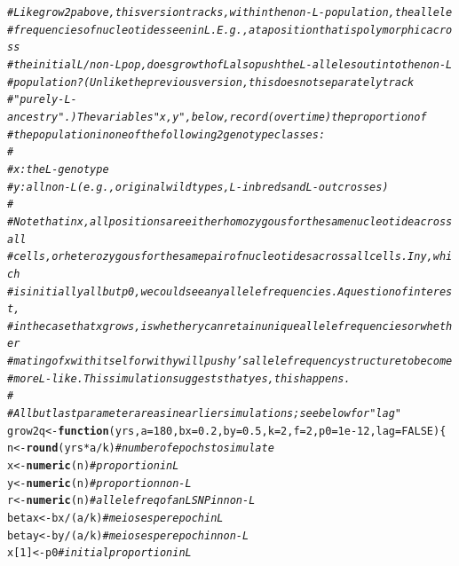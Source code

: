 \documentclass{article}\usepackage[]{graphicx}\usepackage[]{color}
\makeatletter
\newcommand{\hlnum}[1]{\textcolor[rgb]{0.686,0.059,0.569}{#1}}%
\newcommand{\hlcom}[1]{\textcolor[rgb]{0.678,0.584,0.686}{\textit{#1}}}%
\newcommand{\hlopt}[1]{\textcolor[rgb]{0,0,0}{#1}}%
\newcommand{\hlstd}[1]{\textcolor[rgb]{0.345,0.345,0.345}{#1}}%
\newcommand{\hlkwa}[1]{\textcolor[rgb]{0.161,0.373,0.58}{\textbf{#1}}}%
\newcommand{\hlkwb}[1]{\textcolor[rgb]{0.69,0.353,0.396}{#1}}%
\newcommand{\hlkwc}[1]{\textcolor[rgb]{0.333,0.667,0.333}{#1}}%
\newcommand{\hlkwd}[1]{\textcolor[rgb]{0.737,0.353,0.396}{\textbf{#1}}}%
\newenvironment{kframe}{%
 \def\at@end@of@kframe{}%
 \ifinner\ifhmode%
  \def\at@end@of@kframe{\end{minipage}}%
  \begin{minipage}{\columnwidth}%
 \fi\fi%
 \def\FrameCommand##1{\hskip\@totalleftmargin \hskip-\fboxsep
 \colorbox{shadecolor}{##1}\hskip-\fboxsep
     \hskip-\linewidth \hskip-\@totalleftmargin \hskip\columnwidth}%
 \MakeFramed {\advance\hsize-\width
   \@totalleftmargin\z@ \linewidth\hsize
   \@setminipage}}%
 {\par\unskip\endMakeFramed%
 \at@end@of@kframe}
\newenvironment{knitrout}{}{} %
\makeatother
\begin{document}
\begin{knitrout}\footnotesize
{}\color{fgcolor}\begin{kframe}
\begin{alltt}
\hlcom{# Like grow2p above, this version tracks, within the non-L-population, the allele}
\hlcom{# frequencies of nucleotides seen in L.  E.g., at a position that is polymorphic across}
\hlcom{# the initial L/non-L pop, does growth of L also push the L-alleles out into the non-L}
\hlcom{# population?  (Unlike the previous version, this does not separately track }
\hlcom{# "purely-L-ancestry".) The variables "x, y", below, record (over time) the proportion of }
\hlcom{# the population in one of the following 2 genotype classes:}
\hlcom{# }
\hlcom{#   x: the L-genotype}
\hlcom{#   y: all non-L (e.g., original wildtypes, L-inbreds and L-outcrosses)}
\hlcom{# }
\hlcom{# Note that in x, all positions are either homozygous for the same nucleotide across all }
\hlcom{# cells, or heterozygous for the same pair of nucleotides across all cells.  In y, which }
\hlcom{# is initially all but p0, we could see any allele frequencies.  A question of interest, }
\hlcom{# in the case that x grows, is whether y can retain unique allele frequencies or whether }
\hlcom{# mating of x with itself or with y will push y's allele frequency structure to become }
\hlcom{# more L-like.  This simulation suggests that yes, this happens.}
\hlcom{#}
\hlcom{# All but last parameter are as in earlier simulations; see below for "lag"}
\hlstd{grow2q} \hlkwb{<-} \hlkwa{function}\hlstd{(}\hlkwc{yrs}\hlstd{,} \hlkwc{a}\hlstd{=}\hlnum{180}\hlstd{,} \hlkwc{bx}\hlstd{=}\hlnum{0.2}\hlstd{,} \hlkwc{by}\hlstd{=}\hlnum{0.5}\hlstd{,} \hlkwc{k}\hlstd{=}\hlnum{2}\hlstd{,} \hlkwc{f}\hlstd{=}\hlnum{2}\hlstd{,} \hlkwc{p0}\hlstd{=}\hlnum{1e-12}\hlstd{,} \hlkwc{lag}\hlstd{=}\hlnum{FALSE}\hlstd{)\{}
  \hlstd{n}   \hlkwb{<-} \hlkwd{round}\hlstd{(yrs}\hlopt{*}\hlstd{a}\hlopt{/}\hlstd{k)}\hlcom{# number of epochs to simulate}
  \hlstd{x}   \hlkwb{<-} \hlkwd{numeric}\hlstd{(n)}    \hlcom{# proportion in L}
  \hlstd{y}   \hlkwb{<-} \hlkwd{numeric}\hlstd{(n)}    \hlcom{# proportion non-L}
  \hlstd{r}   \hlkwb{<-} \hlkwd{numeric}\hlstd{(n)}    \hlcom{# allele freq of an L SNP in non-L}
  \hlstd{betax} \hlkwb{<-} \hlstd{bx}\hlopt{/}\hlstd{(a}\hlopt{/}\hlstd{k)}    \hlcom{# meioses per epoch in L}
  \hlstd{betay} \hlkwb{<-} \hlstd{by}\hlopt{/}\hlstd{(a}\hlopt{/}\hlstd{k)}    \hlcom{# meioses per epoch in non-L}
  \hlstd{x[}\hlnum{1}\hlstd{]}  \hlkwb{<-} \hlstd{p0}          \hlcom{# initial proportion in L}

\end{alltt}
\end{kframe}
\end{knitrout}
\end{document}
